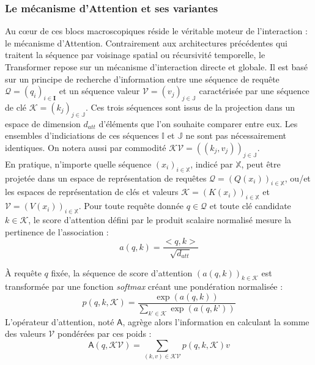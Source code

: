 \subsubsection{Le mécanisme d'Attention et ses variantes}
\label{seq:attvar}
Au cœur de ces blocs macroscopiques réside le véritable moteur de l'interaction : le mécanisme d'Attention. Contrairement aux architectures précédentes qui traitent la séquence par voisinage spatial ou récursivité temporelle, le Transformer repose sur un mécanisme d'interaction directe et globale. Il est basé sur un principe de recherche d’information entre une séquence de requête $\mathcal{Q} = (q_i)_{i \in \mathbf{I}}$ et un séquence valeur $\mathcal{V} = (v_j)_{j \in \mathbb{J}}$ caractérisée par une séquence de clé $\mathcal{K} = (k_j)_{j \in \mathbb{J}}$. Ces trois séquences sont issus de la projection dans un espace de dimension $d_{att}$ d'éléments que l'on souhaite comparer entre eux. Les ensembles d'indiciations de ces séquences $\mathbb{I}$ et $\mathbb{J}$ ne sont pas nécessairement identiques. On notera aussi par commodité $\mathcal{KV} = ((k_j, v_j))_{j \in \mathbb{J}}$.\\

En pratique, n’importe quelle séquence $(x_i)_{i \in \mathbb{X}}$, indicé par $\mathbb{X}$, peut être projetée dans un espace de représentation de requêtes $\mathcal{Q} = (Q(x_i))_{i \in \mathbb{X}}$, ou/et les espaces de représentation de clés et valeurs $\mathcal{K} = (K(x_i))_{i \in \mathbb{X}}$ et $\mathcal{V} = (V(x_i))_{i \in \mathbb{X}}$.
Pour toute requête donnée $q \in \mathcal{Q}$ et toute clé candidate $k \in \mathcal{K}$, le score d'attention défini par le produit scalaire normalisé mesure la pertinence de l'association :
\begin{equation}
a(q, k) = \frac{<q,k>}{\sqrt{d_{att}}}
\label{attentionscore}
\end{equation}

À requête $q$ fixée, la séquence de score d'attention $(a(q,k))_{k \in \mathcal{K}}$ est transformée par une fonction \textit{softmax} créant une pondération normalisée :
\begin{equation}
p(q,k, \mathcal{K}) = \frac{\exp(a(q, k))}{\sum_{k’ \in \mathcal{K}}\exp(a(q,k’))}
\label{pondatt}
\end{equation}
L'opérateur d'attention, noté $\mathsf{A}$, agrège alors l'information en calculant la somme des valeurs $\mathcal{V}$ pondérées par ces poids :
\begin{equation}
\mathsf{A}(q, \mathcal{KV}) = \sum_{(k, v) \in \mathcal{KV}} p(q,k, \mathcal{K}) v
\label{attentionoperator}
\end{equation}

